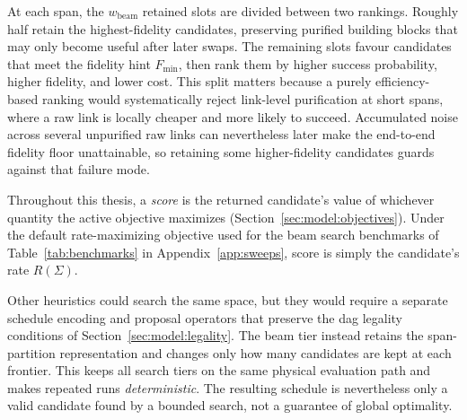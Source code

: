 At each span, the $w_\text{beam}$ retained slots are divided between two rankings. Roughly half retain the highest-fidelity candidates, preserving purified building blocks that may only become useful after later swaps. The remaining slots favour candidates that meet the fidelity hint $F_{\min}$, then rank them by higher success probability, higher fidelity, and lower cost. This split matters because a purely efficiency-based ranking would systematically reject link-level purification at short spans, where a raw link is locally cheaper and more likely to succeed. Accumulated noise across several unpurified raw links can nevertheless later make the end-to-end fidelity floor unattainable, so retaining some higher-fidelity candidates guards against that failure mode.

Throughout this thesis, a \emph{score} is the returned candidate's value of whichever quantity the active objective maximizes (Section~\ref{sec:model:objectives}). Under the default rate-maximizing objective used for the beam search benchmarks of Table~\ref{tab:benchmarks} in Appendix~\ref{app:sweeps}, score is simply the candidate's rate $R(\Sigma)$.


Other heuristics could search the same space, but they would require a separate schedule encoding and proposal operators that preserve the \Gls{dag} legality conditions of Section~\ref{sec:model:legality}. The beam tier instead retains the span-partition representation and changes only how many candidates are kept at each frontier. This keeps all search tiers on the same physical evaluation path and makes repeated runs \emph{deterministic}. The resulting schedule is nevertheless only a valid candidate found by a bounded search, not a guarantee of global optimality.